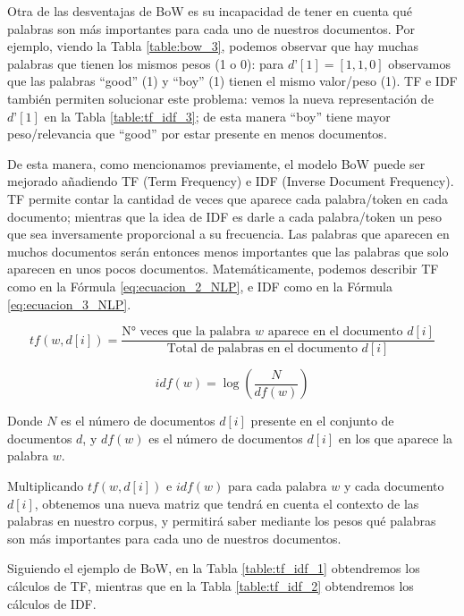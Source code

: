 \documentclass[12pt,a4paper]{article}
\begin{document}
\begin{sloppypar}
Otra de las desventajas de BoW es su incapacidad de tener en cuenta qué palabras son más importantes para cada uno de nuestros documentos\cite{NLP_2}. Por ejemplo, viendo la Tabla \ref{table:bow_3}, podemos observar que hay muchas palabras que tienen los mismos pesos (1 o 0): para $d’[1] = [1,1,0]$ observamos que las palabras “good” (1) y “boy” (1) tienen el mismo valor/peso (1). TF e IDF también permiten solucionar este problema: vemos la nueva representación de $d’[1]$ en la Tabla \ref{table:tf_idf_3}; de esta manera “boy” tiene mayor peso/relevancia que “good” por estar presente en menos documentos.

De esta manera, como mencionamos previamente, el modelo BoW puede ser mejorado añadiendo TF (Term Frequency) e IDF (Inverse Document Frequency). TF permite contar la cantidad de veces que aparece cada palabra/token en cada documento; mientras que la idea de IDF es darle a cada palabra/token un peso que sea inversamente proporcional a su frecuencia. Las palabras que aparecen en muchos documentos serán entonces menos importantes que las palabras que solo aparecen en unos pocos documentos\cite{apunte_uba}. Matemáticamente, podemos describir TF como en la Fórmula \ref{eq:ecuacion_2_NLP}, e IDF como en la Fórmula \ref{eq:ecuacion_3_NLP}.   

\begin{equation}\label{eq:ecuacion_2_NLP}
tf (w, d[i]) = \frac{\text{N° veces que la palabra $w$ aparece en el documento } d[i]} {{\text{Total de palabras en el documento } d[i]}}
\end{equation}

\begin{equation}\label{eq:ecuacion_3_NLP}
idf(w) = \log{(\frac{N}{df(w)})}
\end{equation}

Donde $N$ es el número de documentos $d[i]$ presente en el conjunto de documentos $d$, y $df(w)$ es el número de documentos $d[i]$ en los que aparece la palabra $w$.

Multiplicando $tf(w,d[i])$ e $idf(w)$ para cada palabra $w$ y cada documento $d[i]$, obtenemos una nueva matriz que tendrá en cuenta el contexto de las palabras en nuestro corpus, y permitirá saber mediante los pesos qué palabras son más importantes para cada uno de nuestros documentos.

Siguiendo el ejemplo de BoW, en la Tabla \ref{table:tf_idf_1} obtendremos los cálculos de TF, mientras que en la Tabla \ref{table:tf_idf_2} obtendremos los cálculos de IDF.


\end{sloppypar}
\end{document}
